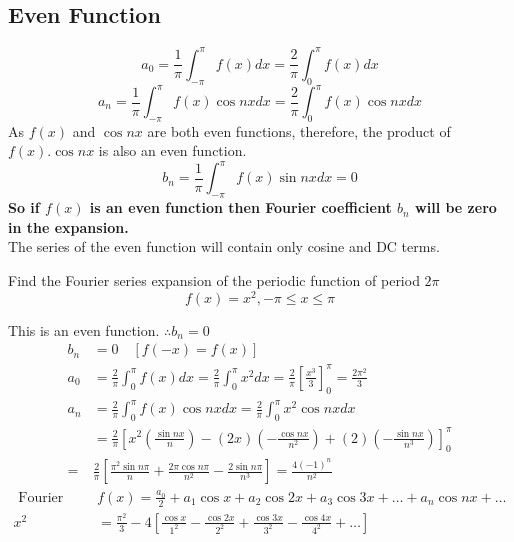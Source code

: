 \subsection{Even Function}
$$
a_{0}=\frac{1}{\pi} \int_{-\pi}^{\pi} f(x) d x=\frac{2}{\pi} \int_{0}^{\pi} f(x) d x
$$
$$
a_{n}=\frac{1}{\pi} \int_{-\pi}^{\pi} f(x) \cos n x d x=\frac{2}{\pi} \int_{0}^{\pi} f(x) \cos n x d x
$$
As $f(x)$ and $\cos n x$ are both even functions, therefore, the product of $f(x) . \cos n x$ is also an even function.
$$
b_{n}=\frac{1}{\pi} \int_{-\pi}^{\pi} f(x) \sin n x d x=0
$$
\textbf{So if $f(x)$ is an even function then Fourier coefficient $b_n$ will be zero in the expansion. }\\
The series of the even function will contain only cosine and DC terms.
\begin{exercise}
	Find the Fourier series expansion of the periodic function of period $2 \pi$
	$$
	f(x)=x^{2},-\pi \leq x \leq \pi
	$$
\end{exercise}
\begin{answer}
	This is an even function. $\therefore b_{n}=0$
	$$
	\begin{aligned}
	b_{n} &=0 \quad[f(-x)=f(x)] \\
	a_{0} &=\frac{2}{\pi} \int_{0}^{\pi} f(x) d x=\frac{2}{\pi} \int_{0}^{\pi} x^{2} d x=\frac{2}{\pi}\left[\frac{x^{3}}{3}\right]_{0}^{\pi}=\frac{2 \pi^{2}}{3} \\
	a_{n} &=\frac{2}{\pi} \int_{0}^{\pi} f(x) \cos n x d x=\frac{2}{\pi} \int_{0}^{\pi} x^{2} \cos n x d x \\
	&=\frac{2}{\pi}\left[x^{2}\left(\frac{\sin n x}{n}\right)-(2 x)\left(-\frac{\cos n x}{n^{2}}\right)+(2)\left(-\frac{\sin n x}{n^{3}}\right)\right]_{0}^{\pi} \\
	=& \frac{2}{\pi}\left[\frac{\pi^{2} \sin n \pi}{n}+\frac{2 \pi \cos n \pi}{n^{2}}-\frac{2 \sin n \pi}{n^{3}}\right]=\frac{4(-1)^{n}}{n^{2}}
	\end{aligned}
	$$
	$\begin{aligned} \text { Fourier series is } & f(x)=\frac{a_{0}}{2}+a_{1} \cos x+a_{2} \cos 2 x+a_{3} \cos 3 x+\ldots+a_{n} \cos n x+\ldots \\ x^{2} &=\frac{\pi^{2}}{3}-4\left[\frac{\cos x}{1^{2}}-\frac{\cos 2 x}{2^{2}}+\frac{\cos 3 x}{3^{2}}-\frac{\cos 4 x}{4^{2}}+\ldots\right] \end{aligned}$
\end{answer}
